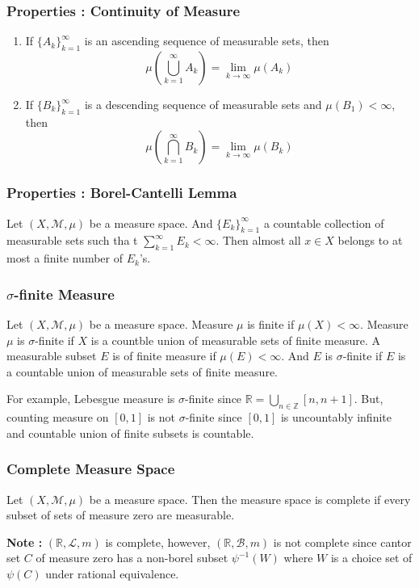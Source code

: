 \subsubsection{Properties : Continuity of Measure}
\begin{enumerate}
	\item If $\{ A_k \}_{k=1}^\infty$ is an ascending sequence of measurable sets, then
		$$ \mu\left( \bigcup_{k=1}^\infty A_k \right) = \lim_{k \to \infty} \mu(A_k) $$
	\item If $\{ B_k \}_{k=1}^\infty$ is a descending sequence of measurable sets and $\mu(B_1) < \infty$, then
		$$ \mu \left( \bigcap_{k=1}^\infty B_k \right) = \lim_{k \to \infty} \mu(B_k) $$
\end{enumerate}
\subsubsection{Properties : Borel-Cantelli Lemma}
	Let $(X,\mathcal{M},\mu)$ be a measure space.
And $\{ E_k \}_{k=1}^\infty$ a countable collection of measurable sets such tha t $\displaystyle \sum_{k=1}^\infty E_k < \infty$.
	Then almost all $x \in X$ belongs to at most a finite number of $E_k$'s.
\subsubsection{$\sigma$-finite Measure}
\begin{definition}
	Let $(X,\mathcal{M},\mu)$ be a measure space.
	Measure $\mu$ is finite if $\mu(X) < \infty$.
	Measure $\mu$ is $\sigma$-finite if $X$ is a countble union of measurable sets of finite measure.
	A measurable subset $E$ is of finite measure if $\mu(E) < \infty$.
	And $E$ is $\sigma$-finite if $E$ is a countable union of measurable sets of finite measure.
\end{definition}
For example, Lebesgue measure is $\sigma$-finite since $\mathbb{R} = \bigcup_{n \in \mathbb{Z}} [n,n+1]$. But, counting measure on $[0,1]$ is not $\sigma$-finite since $[0,1]$ is uncountably infinite and countable union of finite subsets is countable.
\subsubsection{Complete Measure Space}
\begin{definition}
	Let $(X,\mathcal{M},\mu)$ be a measure space.
	Then the measure space is complete if every subset of sets of measure zero are measurable.
\end{definition}
\textbf{Note : } $(\mathbb{R},\mathcal{L},m)$ is complete, however, $(\mathbb{R},\mathcal{B},m)$ is not complete since cantor set $C$  of measure zero has a non-borel subset $\psi^{-1}(W)$ where $W$ is a choice set of $\psi(C)$ under rational equivalence.

